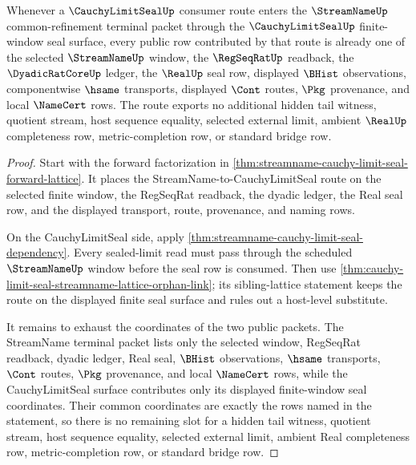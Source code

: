 \begin{theorem}
\label{thm:streamname-cauchy-limit-seal-reverse-source-exhaustion}
Whenever a $\CauchyLimitSealUp$ consumer route enters the $\StreamNameUp$ common-refinement terminal packet through the $\CauchyLimitSealUp$ finite-window seal surface, every public row contributed by that route is already one of the selected $\StreamNameUp$ window, the $\RegSeqRatUp$ readback, the $\DyadicRatCoreUp$ ledger, the $\RealUp$ seal row, displayed $\BHist$ observations, componentwise $\hsame$ transports, displayed $\Cont$ routes, $\Pkg$ provenance, and local $\NameCert$ rows. The route exports no additional hidden tail witness, quotient stream, host sequence equality, selected external limit, ambient $\RealUp$ completeness row, metric-completion row, or standard bridge row.
\end{theorem}
\begin{proof}
Start with the forward factorization in \autoref{thm:streamname-cauchy-limit-seal-forward-lattice}. It places the StreamName-to-CauchyLimitSeal route on the selected finite window, the RegSeqRat readback, the dyadic ledger, the Real seal row, and the displayed transport, route, provenance, and naming rows.

On the CauchyLimitSeal side, apply \autoref{thm:streamname-cauchy-limit-seal-dependency}. Every sealed-limit read must pass through the scheduled $\StreamNameUp$ window before the seal row is consumed. Then use \autoref{thm:cauchy-limit-seal-streamname-lattice-orphan-link}; its sibling-lattice statement keeps the route on the displayed finite seal surface and rules out a host-level substitute.

It remains to exhaust the coordinates of the two public packets. The StreamName terminal packet lists only the selected window, RegSeqRat readback, dyadic ledger, Real seal, $\BHist$ observations, $\hsame$ transports, $\Cont$ routes, $\Pkg$ provenance, and local $\NameCert$ rows, while the CauchyLimitSeal surface contributes only its displayed finite-window seal coordinates. Their common coordinates are exactly the rows named in the statement, so there is no remaining slot for a hidden tail witness, quotient stream, host sequence equality, selected external limit, ambient Real completeness row, metric-completion row, or standard bridge row.
\end{proof}


